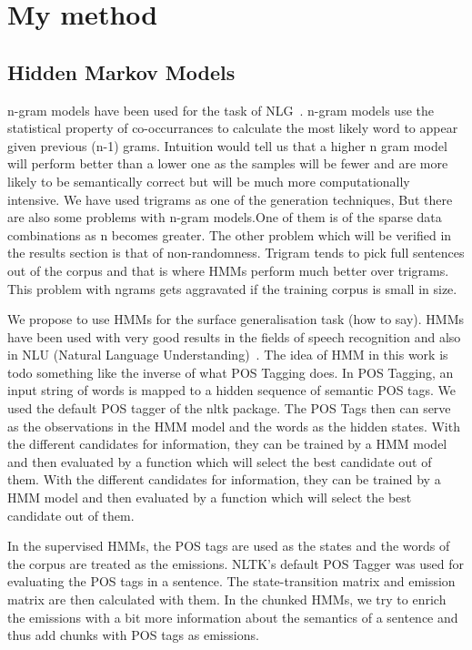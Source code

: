 \documentclass[a4paper,12pt]{article}
\begin{document}
\section{My method}
\label{sec:method}

\subsection{Hidden Markov Models}

n-gram models have been used for the task of NLG~\cite{nlgngram}. n-gram models use the
statistical property of co-occurrances to calculate the most likely word to
appear given previous (n-1) grams. Intuition would tell us that a higher n gram
model will perform better than a lower one as the samples will be fewer and are
more likely to be semantically correct but will be much more computationally
intensive. We have used trigrams as one of the generation techniques, But there 
are  also some problems with n-gram models.One of them 
is of the sparse data combinations as n becomes greater. The other problem which will be 
verified in the results section is that of non-randomness. Trigram tends to 
pick full sentences out of the corpus and that is where HMMs perform much
better over trigrams. This problem with ngrams gets aggravated if the training
corpus is small in size. 


We propose to use HMMs for the surface generalisation task (how to say). HMMs
have been used with very good results in the fields of speech recognition and
also in NLU (Natural Language Understanding)~\cite{hmmsr}. The idea of HMM in this
work is todo something like the inverse of what POS Tagging does. In POS Tagging, an input
string of words is mapped to a hidden sequence of semantic POS tags. We used
the default POS tagger of the nltk package. The POS Tags then can serve as the
observations in the HMM model and the words as the hidden states.  With the
different candidates for information, they can be trained by a HMM model and
then evaluated by a function which will select the best candidate out of them.
With the different candidates for information, they can be trained by a HMM
model and then evaluated by a function which will select the best candidate
out of them.

In the supervised HMMs, the POS tags are used as the states and the words of
the corpus are treated as the emissions. NLTK's default POS Tagger was used 
for evaluating the POS tags in a sentence. The state-transition matrix and 
emission matrix are then calculated with them.
In the chunked HMMs, we try to enrich the emissions with a bit more information
about the semantics of a sentence and thus add chunks with POS tags as emissions.
\end{document}
